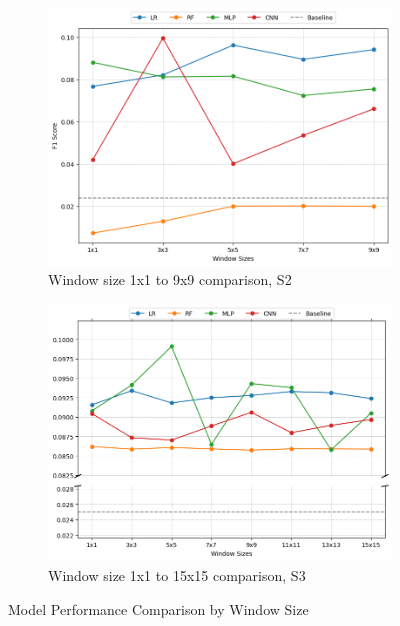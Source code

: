 \documentclass[a4paper,11pt]{report}
\begin{document}
\begin{figure}[H]
\centering
\begin{subfigure}[b]{0.4\textwidth}
    \centering
    \includegraphics[width=\textwidth]{images/window_size_s2.png}
    \caption{Window size 1x1 to 9x9 comparison, S2}
    \label{fig:window_size_s2}
\end{subfigure}
  \hfill
\begin{subfigure}[b]{0.4\textwidth}
    \centering
    \includegraphics[width=\textwidth]{images/window_size_s3.png}
    \caption{Window size 1x1 to 15x15 comparison, S3}
    \label{fig:window_size_s3}
\end{subfigure}
\caption{Model Performance Comparison by Window Size}
\label{fig:window_size}
\end{figure}
\end{document}
